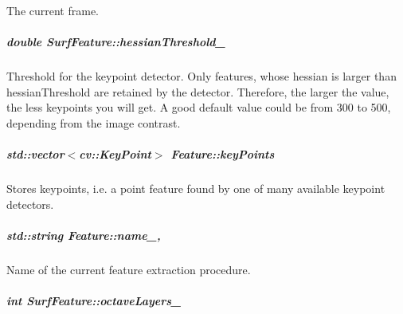 The current frame. 

\hypertarget{group___feature_extractor_a32db9f77d27527ff7c25824d954e30bc}{
\subparagraph[{hessian\-Threshold\-\_\-}]{\setlength{\rightskip}{0pt plus 5cm}double Surf\-Feature\-::hessian\-Threshold\-\_\-\hspace{0.3cm}{\ttfamily [private]}}}\label{group___feature_extractor_a32db9f77d27527ff7c25824d954e30bc}


Threshold for the keypoint detector. Only features, whose hessian is larger than hessian\-Threshold are retained by the detector. Therefore, the larger the value, the less keypoints you will get. A good default value could be from 300 to 500, depending from the image contrast. 

\hypertarget{group___feature_extractor_ac666ae973c3840be1b3b9183dd12b8c1}{
\subparagraph[{key\-Points}]{\setlength{\rightskip}{0pt plus 5cm}std\-::vector$<$cv\-::\-Key\-Point$>$ Feature\-::key\-Points\hspace{0.3cm}{\ttfamily [inherited]}}}\label{group___feature_extractor_ac666ae973c3840be1b3b9183dd12b8c1}


Stores keypoints, i.\-e. a point feature found by one of many available keypoint detectors. 

\hypertarget{group___feature_extractor_a46e9fc1f327aaafb10de2c0425d311aa}{
\subparagraph[{name\-\_\-}]{\setlength{\rightskip}{0pt plus 5cm}std\-::string Feature\-::name\-\_\-\hspace{0.3cm}{\ttfamily [protected]}, {\ttfamily [inherited]}}}\label{group___feature_extractor_a46e9fc1f327aaafb10de2c0425d311aa}


Name of the current feature extraction procedure. 

\hypertarget{group___feature_extractor_a1693fb1e68f90350c607c1e228743130}{
\subparagraph[{octave\-Layers\-\_\-}]{\setlength{\rightskip}{0pt plus 5cm}int Surf\-Feature\-::octave\-Layers\-\_\-\hspace{0.3cm}{\ttfamily [private]}}}\label{group___feature_extractor_a1693fb1e68f90350c607c1e228743130}


